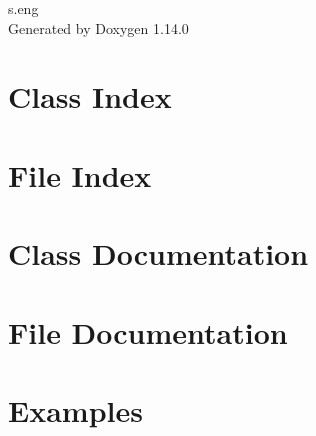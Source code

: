 \documentclass[twoside]{book}
\newcommand{\+}{\discretionary{\mbox{\scriptsize$\hookleftarrow$}}{}{}}
\newcommand{\clearemptydoublepage}{%
    \newpage{\pagestyle{empty}\cleardoublepage}%
  }
\begin{document}
  \raggedbottom
    \hypersetup{pageanchor=false,
                bookmarksnumbered=true,
                pdfencoding=unicode
               }
  \begin{titlepage}
  \vspace*{7cm}
  \begin{center}%
  {\Large s.\+eng}\\
  \vspace*{1cm}
  {\large Generated by Doxygen 1.14.0}\\
  \end{center}
  \end{titlepage}
  \clearemptydoublepage
  \tableofcontents
  \clearemptydoublepage
  \hypersetup{pageanchor=true}

\chapter{Class Index}

\chapter{File Index}

\chapter{Class Documentation}






\chapter{File Documentation}





\chapter{Examples}


  \backmatter
  \newpage
  \clearemptydoublepage
  \printindex
\end{document}
